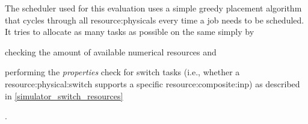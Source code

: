 The scheduler used for this evaluation uses a simple greedy placement algorithm that cycles through all \glspl{resource:physical} every time a job needs to be scheduled.
It tries to allocate as many tasks as possible on the same  simply by
\begin{mylist}
    \item checking the amount of available numerical resources and
    \item performing the \textit{properties} check for switch tasks
    \ifdefined\THESISSUMMARY
    (i.e., whether a \gls{resource:physical:switch} supports a specific \gls{resource:composite:inp})
    \else
    as described in \autoref{simulator_switch_resources}
    \fi
\end{mylist}.